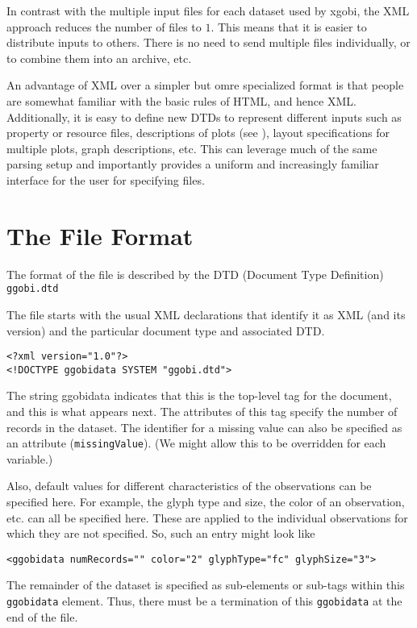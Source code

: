 \documentclass{article}
\begin{document}
In contrast with the multiple input files for each dataset used by
xgobi, the XML approach reduces the number of files to $1$. This means
that it is easier to distribute inputs to others. There is no need to
send multiple files individually, or to combine them into an archive,
etc.

An advantage of XML over a simpler but omre specialized format is that
people are somewhat familiar with the basic rules of HTML, and hence
XML. Additionally, it is easy to define new DTDs to represent
different inputs such as property or resource files, descriptions of
plots (see ), layout specifications for multiple plots,
graph descriptions, etc.  This can leverage much of the same parsing
setup and importantly provides a uniform and increasingly familiar
interface for the user for specifying files.




\section{The File Format}
The format of the file is described by the 
DTD (Document Type Definition) 
\texttt{ggobi.dtd}

The file starts with the usual XML
declarations that identify it as XML
(and its version)
and the particular document type
and associated DTD.
\begin{verbatim}
<?xml version="1.0"?>
<!DOCTYPE ggobidata SYSTEM "ggobi.dtd">
\end{verbatim}
The string ggobidata indicates that this is the top-level tag for the
document, and this is what appears next.  The attributes of this tag
specify the number of records in the dataset.  The identifier for a
missing value can also be specified as an attribute
(\texttt{missingValue}). (We might allow this to be overridden for
each variable.)

Also, default values for different characteristics of the observations
can be specified here.  For example, the glyph type and size, the
color of an observation, etc. can all be specified here.  These are
applied to the individual observations for which they are not
specified.  So, such an entry might look like
\begin{verbatim}
<ggobidata numRecords="" color="2" glyphType="fc" glyphSize="3">
\end{verbatim}
The remainder of the dataset is specified as sub-elements or sub-tags
within this \texttt{ggobidata} element.  Thus, there must be a
termination of this \texttt{ggobidata} at the end of the file.
\end{document}

